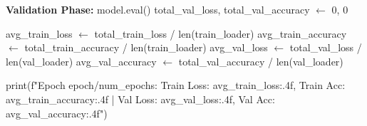 \begin{algorithm*}[!t]
{{ 			\textbf{Validation Phase:}\;
 			model.eval()\;
 			total\_val\_loss, total\_val\_accuracy $\gets$ 0, 0\;
 			
 			avg\_train\_loss $\gets$ total\_train\_loss / len(train\_loader)\;
 			avg\_train\_accuracy $\gets$ total\_train\_accuracy / len(train\_loader)\;
 			avg\_val\_loss $\gets$ total\_val\_loss / len(val\_loader)\;
 			avg\_val\_accuracy $\gets$ total\_val\_accuracy / len(val\_loader)\;
 			
 			print(f"Epoch {epoch}/{num\_epochs}: Train Loss: {avg\_train\_loss:.4f}, Train Acc: {avg\_train\_accuracy:.4f} | Val Loss: {avg\_val\_loss:.4f}, Val Acc: {avg\_val\_accuracy:.4f}")
 		}
 	}
 \end{algorithm*}
 
 
 
 
 
